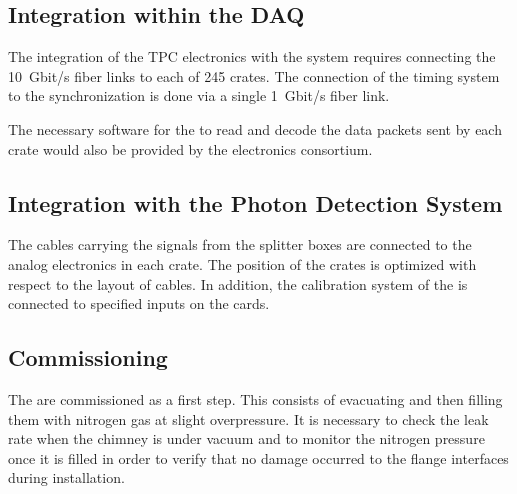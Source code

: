 \subsection{Integration within the DAQ}
\label{sec:fddp-tpc-elec-install-daq}
The integration of the \dual TPC electronics with the  system requires connecting the \SI{10}{Gbit/s} fiber links to each of \num{245}  crates. The connection of the timing system to the synchronization  is done via a single \SI{1}{Gbit/s} fiber link. 

The necessary software for the  to read and decode the data packets sent by each  crate would also be provided by the electronics consortium.   

\subsection{Integration with the Photon Detection System}
\label{sec:fddp-tpc-elec-install-pmt}
The cables carrying the  signals from the splitter boxes %
are connected to the  analog electronics in each  crate. The position of the crates %
is optimized with respect to the layout of  cables. In addition, the calibration system of the  %
is connected to specified inputs on the cards.



\subsection{Commissioning}
\label{sec:fddp-tpc-elec-comission}

The  are commissioned as a first step. This consists of evacuating and then filling them with nitrogen gas at slight overpressure. %
It is necessary to check the leak rate when the chimney is under vacuum and to monitor the nitrogen pressure once it is filled in order to verify that no damage occurred to the flange interfaces during installation.

